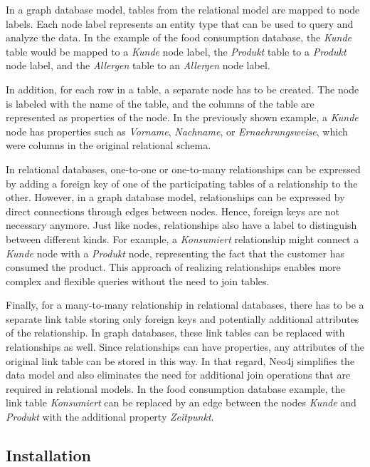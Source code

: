 In a graph database model, tables from the relational model are mapped to node labels. Each node label represents an entity type that can be used to query and analyze the data. In the example of the food consumption database, the \textit{Kunde} table would be mapped to a \textit{Kunde} node label, the \textit{Produkt} table to a \textit{Produkt} node label, and the \textit{Allergen} table to an \textit{Allergen} node label.

In addition, for each row in a table, a separate node has to be created. The node is labeled with the name of the table, and the columns of the table are represented as properties of the node. In the previously shown example, a \textit{Kunde} node has properties such as \textit{Vorname}, \textit{Nachname}, or \textit{Ernaehrungsweise}, which were columns in the original relational schema.

In relational databases, one-to-one or one-to-many relationships can be expressed by adding a foreign key of one of the participating tables of a relationship to the other. However, in a graph database model, relationships can be expressed by direct connections through edges between nodes. Hence, foreign keys are not necessary anymore. Just like nodes, relationships also have a label to distinguish between different kinds. For example, a \textit{Konsumiert} relationship might connect a \textit{Kunde} node with a \textit{Produkt} node, representing the fact that the customer has consumed the product. This approach of realizing relationships enables more complex and flexible queries without the need to join tables.

Finally, for a many-to-many relationship in relational databases, there has to be a separate link table storing only foreign keys and potentially additional attributes of the relationship. In graph databases, these link tables can be replaced with relationships as well. Since relationships can have properties, any attributes of the original link table can be stored in this way. In that regard, Neo4j simplifies the data model and also eliminates the need for additional join operations that are required in relational models. In the food consumption database example, the link table \textit{Konsumiert} can be replaced by an edge between the nodes \textit{Kunde} and \textit{Produkt} with the additional property \textit{Zeitpunkt}.

\subsection{Installation} \label{subsec:installationNeo4j}

